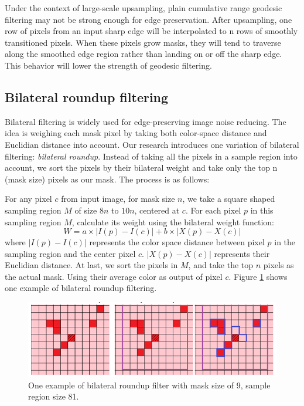 Under the context of large-scale upsampling, plain cumulative range geodesic filtering may not be strong enough for edge preservation. After upsampling, one row of pixels from an input sharp edge will be interpolated to n rows of smoothly transitioned pixels. When these pixels grow masks, they will tend to traverse along the smoothed edge region rather than landing on or off the sharp edge. This behavior will lower the strength of geodesic filtering. 





\subsection{Bilateral roundup filtering}\label{Bilateral roundup filtering}
Bilateral filtering is widely used for edge-preserving image noise reducing. The idea is weighing each mask pixel by taking both color-space distance and Euclidian distance into account. Our research introduces one variation of bilateral filtering: \textit{bilateral roundup}. Instead of taking all the pixels in a sample region into account, we sort the pixels by their bilateral weight and take only the top n (mask size) pixels as our mask. The process is as follows:

For any pixel $c$ from input image, for mask size $n$, we take a square shaped sampling region $M$ of size $8n$ to $10n$, centered at $c$. For each pixel $p$ in this sampling region $M$, calculate its weight using the bilateral weight function:
\begin{equation}\label {brndupEquation}
W = a \times |I(p)-I(c)|  + b \times |X(p)-X(c)|
\end{equation}
where $|I(p)-I(c)|$ represents the color space distance between pixel $p$ in the sampling region and the center pixel $c$. $|X(p)-X(c)|$ represents their Euclidian distance. At last, we sort the pixels in $M$, and take the top $n$ pixels as the actual mask. Using their average color as output of pixel $c$. Figure \ref{fig:BrndupExplanation} shows one example of bilateral roundup filtering.

\begin{figure}[htbp]\centering
\includegraphics[width=1.0\textwidth]{f5}
\caption{One example of bilateral roundup filter with mask size of 9, sample region size 81. }
\label{fig:BrndupExplanation}
\end{figure}

